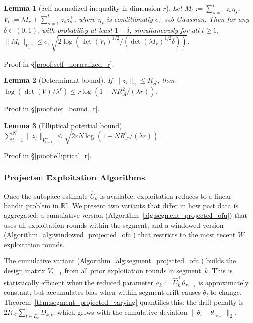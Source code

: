 \documentclass{article}
\newcommand{\R}{\mathbb{R}}
\newcommand{\cA}{\mathcal{A}}
\newtheorem{lemma}{Lemma}
\begin{document}
\begin{lemma}[Self-normalized inequality in dimension $r$]
\label{lem:self_normalized_r}
Let $M_t := \sum_{s=1}^t z_s \eta_s$, $V_t := \lambda I_r + \sum_{s=1}^t z_s z_s^\top$, where $\eta_s$ is conditionally $\sigma_\varepsilon$-sub-Gaussian. Then for any $\delta\in(0,1)$, with probability at least $1-\delta$, simultaneously for all $t\ge 1$,
$\|M_t\|_{V_t^{-1}} \le \sigma_\varepsilon \sqrt{2\log(\det(V_t)^{1/2}/(\det(\lambda I_r)^{1/2}\delta))}$.
\end{lemma}

Proof in \S\ref{proof:self_normalized_r}.

\begin{lemma}[Determinant bound]
\label{lem:det_bound_r}
If $\|z_s\|_2\le R_{\cA}$, then $\log(\det(V)/\lambda^r) \le r\log(1+N R_{\cA}^2/(\lambda r))$.
\end{lemma}

Proof in \S\ref{proof:det_bound_r}.

\begin{lemma}[Elliptical potential bound]
\label{lem:elliptical_r}
$\sum_{t=1}^N \|z_t\|_{V_{t-1}^{-1}} \le \sqrt{2rN\log(1+N R_{\cA}^2/(\lambda r))}$.
\end{lemma}

Proof in \S\ref{proof:elliptical_r}.

\subsubsection{Projected Exploitation Algorithms}

  Once the subspace estimate $\widehat U_k$ is available, exploitation reduces to
  a linear bandit problem in $\R^r$.  We present two variants that differ in how
  past data is aggregated: a cumulative version (Algorithm~\ref{alg:segment_projected_ofu})
  that uses all exploitation rounds within the segment, and a windowed version
  (Algorithm~\ref{alg:windowed_projected_ofu}) that restricts to the most recent
  $W$ exploitation rounds.

  The cumulative variant (Algorithm~\ref{alg:segment_projected_ofu}) builds the
  design matrix $\widetilde V_{t-1}$ from all prior exploitation rounds in
  segment~$k$.  This is statistically efficient when the reduced parameter
  $a_k := \widehat U_k^\top \theta_{\tau_{k-1}}$ is approximately constant, but
  accumulates bias when within-segment drift causes $\theta_t$ to change.
  Theorem~\ref{thm:segment_projected_varying} quantifies this: the drift penalty
  is $2R_{\cA} \sum_{t \in E_k} D_{k,t}$, which grows with the cumulative deviation
  $\|\theta_t - \theta_{\tau_{k-1}}\|_2$.
\end{document}
